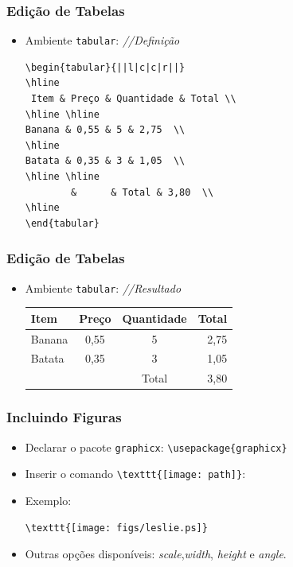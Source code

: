 \begin{frame}[fragile]
\frametitle{Edição de Tabelas}


\begin{itemize}
  \item Ambiente \texttt{tabular}: {\color{oliveGreen} \textit{//Definição}}
 {\small
  \begin{verbatim}
\begin{tabular}{||l|c|c|r||} 
\hline
 Item & Preço & Quantidade & Total \\ 
\hline \hline
Banana & 0,55 & 5 & 2,75  \\
\hline
Batata & 0,35 & 3 & 1,05  \\
\hline \hline
￼       &      & Total & 3,80  \\
\hline
\end{tabular}  
  \end{verbatim}
 }
\end{itemize}
\end{frame}
\begin{frame}[fragile]
\frametitle{Edição de Tabelas}

\begin{itemize}
  \item Ambiente \texttt{tabular}: {\color{oliveGreen} \textit{//Resultado}}
  \newline
  \newline
\begin{tabular}{|l|c|c|r|} 
\hline
 Item & Preço & Quantidade & Total \\ 
\hline
Banana & 0,55 & 5 & 2,75  \\
\hline
Batata & 0,35 & 3 & 1,05  \\
\hline 
& & Total & 3,80 \\
\hline
\end{tabular}  
\end{itemize}
\end{frame}


\begin{frame}[fragile]
\frametitle{Incluindo Figuras}

\begin{itemize}
  \item Declarar o pacote \texttt{graphicx}: \verb|\usepackage{graphicx}|
  \item Inserir o comando \verb|\texttt{[image: path]}|:
  \item Exemplo:
  {\small
  \begin{verbatim}
\texttt{[image: figs/leslie.ps]}
  \end{verbatim}
  }
  \item Outras opções disponíveis: \textit{scale},\textit{width}, \textit{height} e \textit{angle}.
\end{itemize}
 
\end{frame}

